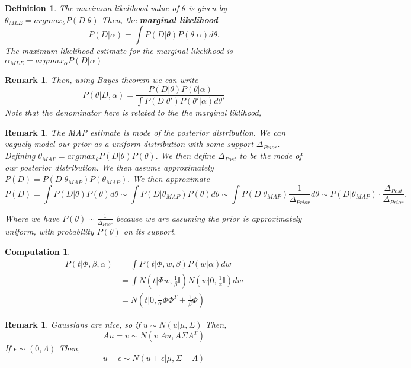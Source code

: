 \documentclass{amsart}
\newtheorem{comp}[subsubsection]{Computation}
\newtheorem{defn}[subsubsection]{Definition}
\newtheorem{rem}[subsubsection]{Remark}
\begin{document}
\begin{defn}
The maximum likelihood value of $\theta$ is given by $\theta_{MLE} = argmax_{\theta} P(D|\theta)$ Then, the {\bf marginal likelihood} 
$$P(D|\alpha)= \int P(D|\theta)P(\theta|\alpha) d\theta.$$
The maximum likelihood estimate for the marginal likelihood is 
$\alpha_{MLE} = argmax_{\alpha} P(D|\alpha)$
\end{defn}

\begin{rem}
Then, using Bayes theorem we can write $$P(\theta|D,\alpha) = \frac{P(D|\theta)P(\theta|\alpha)}{\int P(D|\theta')P(\theta'|\alpha)d\theta'}$$ Note that the denominator here is related to the the marginal liklihood, 
\end{rem}

\begin{rem}
  The MAP estimate is mode of the posterior distribution. We can vaguely model our prior as a uniform distribution with some support $\Delta_{Prior}.$ Defining $\theta_{MAP} = argmax_\theta P(D|\theta)P(\theta).$ We then define $\Delta_{Post}$ to be the mode of our posterior distribution. We then assume approximately $P(D) = P(D|\theta_{MAP} ) P(\theta_{MAP}).$ We then approximate $$P(D) = \int P(D|\theta)P(\theta) d \theta \sim \int P(D|\theta_{MAP})P(\theta)d\theta \sim \int P(D|\theta_{MAP}) \frac 1 {\Delta_{Prior}} d\theta \sim P(D|\theta_{MAP}) \cdot \frac {\Delta_{Post}}{\Delta_{Prior}}.$$

Where we have $P(\theta) \sim \frac 1 {\Delta_{Prior}}$ because we are assuming the prior is approximately uniform, with probability $P(\theta)$ on its support.
\end{rem}

\begin{comp}
\begin{align*}
P(t|\Phi,\beta,\alpha) &= \int P(t|\Phi,w,\beta)P(w|\alpha)dw 
\\
&= \int N(t|\Phi w, \frac 1 \beta \mathbb I)N(w|0,\frac 1 \alpha \mathbb I) dw
\\
&= N(t|0,\frac 1 \alpha \Phi \Phi^T + \frac 1 \beta \Phi)
\end{align*}
\end{comp}

\begin{rem}
Gaussians are nice, so if $u \sim N(u|\mu, \Sigma)$
Then,
$$Au = v \sim N(v|Au, A\Sigma A^T)$$
If $\epsilon \sim(0, \Lambda)$
Then, 
$$u+\epsilon \sim N(u+\epsilon|\mu, \Sigma+\Lambda)$$
\end{rem}
\end{document}
